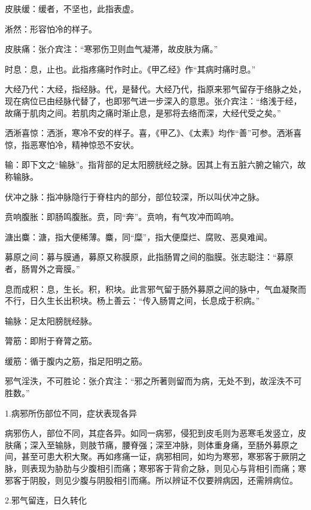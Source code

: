 \documentclass[draft,12pt]{ctexbook}
\begin{document}
\begin{jiaozhu}
  \item 皮肤缓：缓者，不坚也，此指表虚。
  \item 淅然：形容怕冷的样子。
  \item 皮肤痛：张介宾注：“寒邪伤卫则血气凝滞，故皮肤为痛。”
  \item 时息：息，止也。此指疼痛时作时止。《甲乙经》作“其病时痛时息。”
  \item 大经乃代：大经，指经脉。代，是替代。大经乃代，指原来邪气留存于络脉之处，现在病位已由经脉代替了，也即邪气进一步深入的意思。张介宾注：“络浅于经，故痛于肌肉之间。若肌肉之痛时渐止息，是邪将去络而深，大经代受之矣。”
  \item 洒淅喜惊：洒浙，寒冷不安的样子。喜，《甲乙》、《太素》均作“善”可参。洒淅喜惊，指恶寒怕冷，精神惊恐不安状。
  \item 输：即下文之“输脉”。指背部的足太阳膀胱经之脉。因其上有五脏六腑之输穴，故称输脉。
  \item 伏冲之脉：指冲脉隐行于脊柱内的部分，部位较深，所以叫伏冲之脉。
  \item 贲响腹胀：即肠鸣腹胀。贲，同“奔”。贲响，有气攻冲而鸣响。
  \item 溏出麋：溏，指大便稀薄。麋，同“糜”，指大便糜烂、腐败、恶臭难闻。
  \item 募原之间：募与膜通，募原又称膜原，此指肠胃之间的脂膜。张志聪注：“募原者，肠胃外之膏膜。”
  \item 息而成积：息，生长。积，积块。此言邪气留于肠外募原之间的脉中，气血凝聚而不行，日久生长出积块。杨上善云：“传入肠胃之间，长息成于积病。”
  \item 输脉：足太阳膀胱经脉。
  \item 膂筋：即附于脊膂之筋。
  \item 缓筋：循于腹内之筋，指足阳明之筋。
  \item 邪气淫泆，不可胜论：张介宾注：“邪之所著则留而为病，无处不到，故淫泆不可胜数。”
\end{jiaozhu}


1.病邪所伤部位不同，症状表现各异

病邪伤人，部位不同，其症各异。如同一病邪，侵犯到皮毛则为恶寒毛发竖立，皮肤痛；深入至输脉，则肢节痛，腰脊强；深至冲脉，则体重身痛，至肠外募原之间，甚至可患大积大聚。再如疼痛一证，病邪相同，如均为寒邪，寒邪客于厥阴之脉，则表现为胁肋与少腹相引而痛；寒邪客于背俞之脉，则见心与背相引而痛；寒邪客于阴股，则见少腹与阴股相引而痛。所以辨证不仅要辨病因，还需辨病位。

2.邪气留连，日久转化
\end{document}
